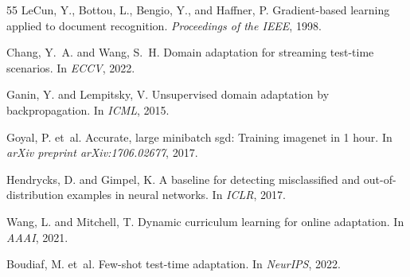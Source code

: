 \documentclass{article}
\theoremstyle{plain}
\theoremstyle{definition}
\theoremstyle{remark}
\begin{document}
\begin{thebibliography}{55}
LeCun, Y., Bottou, L., Bengio, Y., and Haffner, P.
\newblock Gradient-based learning applied to document recognition.
\newblock \emph{Proceedings of the IEEE}, 1998.

Chang, Y.~A. and Wang, S.~H.
\newblock Domain adaptation for streaming test-time scenarios.
\newblock In \emph{ECCV}, 2022.

Ganin, Y. and Lempitsky, V.
\newblock Unsupervised domain adaptation by backpropagation.
\newblock In \emph{ICML}, 2015.

Goyal, P. et~al.
\newblock Accurate, large minibatch sgd: Training imagenet in 1 hour.
\newblock In \emph{arXiv preprint arXiv:1706.02677}, 2017.

Hendrycks, D. and Gimpel, K.
\newblock A baseline for detecting misclassified and out-of-distribution examples in neural networks.
\newblock In \emph{ICLR}, 2017.

Wang, L. and Mitchell, T.
\newblock Dynamic curriculum learning for online adaptation.
\newblock In \emph{AAAI}, 2021.

Boudiaf, M. et~al.
\newblock Few-shot test-time adaptation.
\newblock In \emph{NeurIPS}, 2022.

\end{thebibliography}
\end{document}
